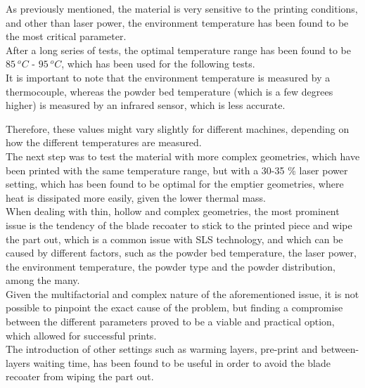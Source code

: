 \documentclass{article}
\begin{document}
          \clearpage
  
  
          As previously mentioned, the material is very sensitive to the printing conditions, and other than laser power,
          the environment temperature has been found to be the most critical parameter. \\ 
  
          After a long series of tests, the optimal temperature range has been found to be $85 \ ^oC$ - $95 \ ^oC$, which has been
          used for the following tests. \\ 
  
          It is important to note that the environment temperature is measured by a thermocouple, whereas the 
          powder bed temperature (which is a few degrees higher) is measured by an infrared sensor, which  
          is less accurate. 
  
          Therefore, these values might vary slightly for different machines, depending on how the different 
          temperatures are measured. \\ 
  
          The next step was to test the material with more complex geometries, which have been printed with the same 
          temperature range, but with a 30-35 \% laser power setting, which has been found to be optimal for the 
          emptier geometries, where heat is dissipated more easily, given the lower thermal mass. \\ 
  
          When dealing with thin, hollow and complex geometries, the most prominent issue is the tendency of the 
          blade recoater to stick to the printed piece and wipe the part out, which is a common 
          issue with SLS technology, and which 
          can be caused by different factors, such as the powder bed temperature, the laser power, the 
          environment temperature, the powder type and the powder distribution, among the many. \\ 
  
          Given the multifactorial and complex nature of the aforementioned issue, it is not possible to 
          pinpoint the exact cause of the problem, but finding a compromise between the 
          different parameters proved to be a viable and practical option, which allowed for successful prints. \\
          
          The introduction of other settings such as warming layers, pre-print 
          and between-layers waiting time, has been found to be useful in order to avoid 
          the blade recoater from wiping the part out. \\
  
\end{document}
